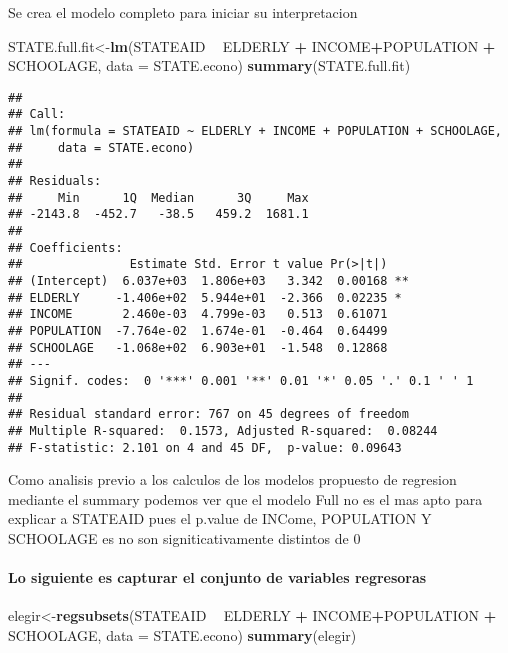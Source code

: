 \documentclass[
]{article}
\newenvironment{Shaded}{\begin{snugshade}}{\end{snugshade}}
\newcommand{\DataTypeTok}[1]{\textcolor[rgb]{0.13,0.29,0.53}{#1}}
\newcommand{\KeywordTok}[1]{\textcolor[rgb]{0.13,0.29,0.53}{\textbf{#1}}}
\newcommand{\NormalTok}[1]{#1}
\newcommand{\OperatorTok}[1]{\textcolor[rgb]{0.81,0.36,0.00}{\textbf{#1}}}
\newcommand{\StringTok}[1]{\textcolor[rgb]{0.31,0.60,0.02}{#1}}
\begin{document}
Se crea el modelo completo para iniciar su interpretacion

\begin{Shaded}
\begin{Highlighting}[]
\NormalTok{STATE.full.fit<-}\KeywordTok{lm}\NormalTok{(STATEAID }\OperatorTok{~}\StringTok{ }\NormalTok{ELDERLY }\OperatorTok{+}\StringTok{ }\NormalTok{INCOME}\OperatorTok{+}\NormalTok{POPULATION }\OperatorTok{+}\StringTok{ }\NormalTok{SCHOOLAGE, }\DataTypeTok{data =}\NormalTok{ STATE.econo)}
\KeywordTok{summary}\NormalTok{(STATE.full.fit)}
\end{Highlighting}
\end{Shaded}

\begin{verbatim}
## 
## Call:
## lm(formula = STATEAID ~ ELDERLY + INCOME + POPULATION + SCHOOLAGE, 
##     data = STATE.econo)
## 
## Residuals:
##     Min      1Q  Median      3Q     Max 
## -2143.8  -452.7   -38.5   459.2  1681.1 
## 
## Coefficients:
##               Estimate Std. Error t value Pr(>|t|)   
## (Intercept)  6.037e+03  1.806e+03   3.342  0.00168 **
## ELDERLY     -1.406e+02  5.944e+01  -2.366  0.02235 * 
## INCOME       2.460e-03  4.799e-03   0.513  0.61071   
## POPULATION  -7.764e-02  1.674e-01  -0.464  0.64499   
## SCHOOLAGE   -1.068e+02  6.903e+01  -1.548  0.12868   
## ---
## Signif. codes:  0 '***' 0.001 '**' 0.01 '*' 0.05 '.' 0.1 ' ' 1
## 
## Residual standard error: 767 on 45 degrees of freedom
## Multiple R-squared:  0.1573, Adjusted R-squared:  0.08244 
## F-statistic: 2.101 on 4 and 45 DF,  p-value: 0.09643
\end{verbatim}

Como analisis previo a los calculos de los modelos propuesto de
regresion mediante el summary podemos ver que el modelo Full no es el
mas apto para explicar a STATEAID pues el p.value de INCome, POPULATION
Y SCHOOLAGE es no son signiticativamente distintos de 0

\hypertarget{lo-siguiente-es-capturar-el-conjunto-de-variables-regresoras}{%
\paragraph{Lo siguiente es capturar el conjunto de variables
regresoras}\label{lo-siguiente-es-capturar-el-conjunto-de-variables-regresoras}}

\begin{Shaded}
\begin{Highlighting}[]
\NormalTok{elegir<-}\KeywordTok{regsubsets}\NormalTok{(STATEAID }\OperatorTok{~}\StringTok{ }\NormalTok{ELDERLY }\OperatorTok{+}\StringTok{ }\NormalTok{INCOME}\OperatorTok{+}\NormalTok{POPULATION }\OperatorTok{+}\StringTok{ }\NormalTok{SCHOOLAGE, }\DataTypeTok{data =}\NormalTok{ STATE.econo)}
\KeywordTok{summary}\NormalTok{(elegir)}
\end{Highlighting}
\end{Shaded}
\end{document}
